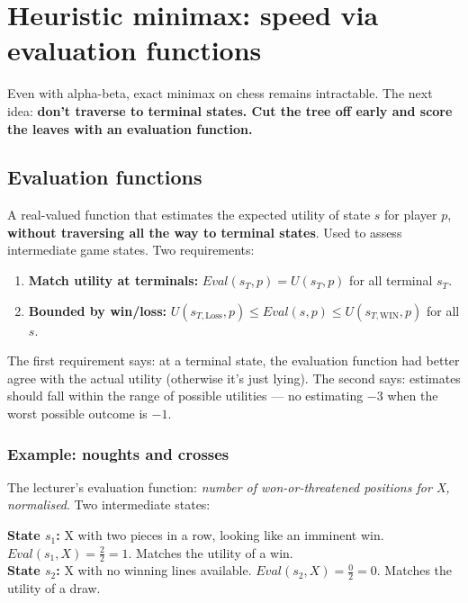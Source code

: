 \documentclass[11pt, a4paper]{article}
\begin{document}
\section{Heuristic minimax: speed via evaluation functions}

Even with alpha-beta, exact minimax on chess remains intractable. The next idea: \textbf{don't traverse to terminal states. Cut the tree off early and score the leaves with an evaluation function.}

\subsection{Evaluation functions}

\begin{defbox}
A real-valued function that estimates the expected utility of state $s$ for player $p$, \textbf{without traversing all the way to terminal states}. Used to assess intermediate game states. Two requirements:
\begin{enumerate}[itemsep=0pt, topsep=0pt]
  \item \textbf{Match utility at terminals:} $\mathit{Eval}(s_T, p) = U(s_T, p)$ for all terminal $s_T$.
  \item \textbf{Bounded by win/loss:} $U(s_{T,\text{Loss}}, p) \le \mathit{Eval}(s, p) \le U(s_{T,\text{WIN}}, p)$ for all $s$.
\end{enumerate}
\end{defbox}

The first requirement says: at a terminal state, the evaluation function had better agree with the actual utility (otherwise it's just lying). The second says: estimates should fall within the range of possible utilities — no estimating $-3$ when the worst possible outcome is $-1$.

\subsubsection*{Example: noughts and crosses}

The lecturer's evaluation function: \emph{number of won-or-threatened positions for X, normalised}. Two intermediate states:

\begin{exbox}
\textbf{State $s_1$:} X with two pieces in a row, looking like an imminent win. $\mathit{Eval}(s_1, X) = \frac{2}{2} = 1$. Matches the utility of a win.\\[0.3em]
\textbf{State $s_2$:} X with no winning lines available. $\mathit{Eval}(s_2, X) = \frac{0}{2} = 0$. Matches the utility of a draw.
\end{exbox}
\end{document}
